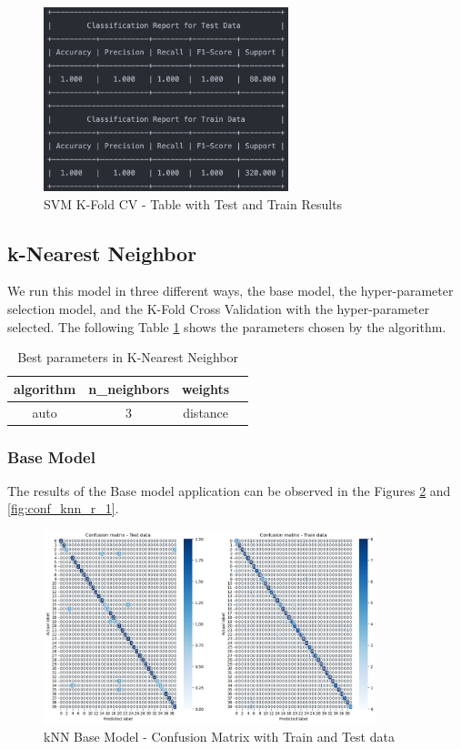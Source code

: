 \documentclass[conference]{IEEEtran}
\begin{document}
\begin{figure}[H]
    \centering
    \includegraphics[width=2.8in]{SVC/r_3.png}%
    \caption{SVM K-Fold CV - Table with Test and Train Results}%
    \label{fig:conf_svm_r_3}%
\end{figure}

\subsection{k-Nearest Neighbor}

We run this model in three different ways, the base model, the hyper-parameter selection model, and the K-Fold Cross Validation with the hyper-parameter selected. The following Table \ref{tab:tab5} shows the parameters chosen by the algorithm.

\begin{table}[H]
    \centering
    \begin{tabular}{||c c c c||} 
     \hline
     algorithm & n_neighbors & weights \\[0.5ex] 
     \hline\hline
     auto & 3 & distance \\ 
    \hline
    \end{tabular}
    \caption{Best parameters in K-Nearest Neighbor} 
    \label{tab:tab5}
\end{table}
\subsubsection{Base Model}
The results of the Base model application can be observed in the Figures \ref{fig:conf_knn_1} and \ref{fig:conf_knn_r_1}. 

\begin{figure}[H]
    \centering
    \includegraphics[width=3.8in]{k-NN/1.png}%
    \caption{kNN Base Model - Confusion Matrix with Train and Test data}%
    \label{fig:conf_knn_1}%
\end{figure}
\end{document}
